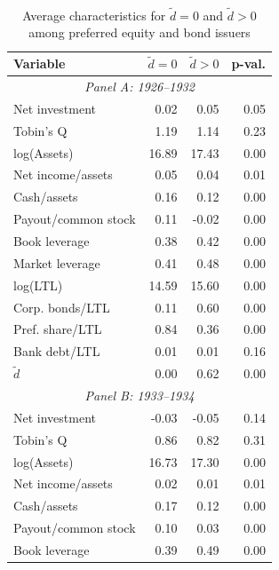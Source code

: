 
\begin{table}[p]
\centering
\caption{\\ Average characteristics for $\tilde{d} = 0$ and $\tilde{d} > 0$ among preferred equity and bond issuers} \scriptsize \label{tab:sum_diff_pos}
    \begin{threeparttable}
        \begin{tabular}{lrrr}
            \toprule
            Variable & \ensuremath{\tilde{d}=0} & \ensuremath{\tilde{d}>0} & p-val. \\
            \midrule
            \multicolumn{4}{c}{\textit{Panel A: 1926--1932}} \\
            \midrule
            Net investment & 0.02 & 0.05 & 0.05 \\
            Tobin's Q & 1.19 & 1.14 & 0.23 \\
            log(Assets) & 16.89 & 17.43 & 0.00 \\
            Net income/assets & 0.05 & 0.04 & 0.01 \\
            Cash/assets & 0.16 & 0.12 & 0.00 \\
            Payout/common stock & 0.11 & -0.02 & 0.00 \\
            Book leverage & 0.38 & 0.42 & 0.00 \\
            Market leverage & 0.41 & 0.48 & 0.00 \\
            log(LTL) & 14.59 & 15.60 & 0.00 \\
            Corp. bonds/LTL & 0.11 & 0.60 & 0.00 \\
            Pref. share/LTL & 0.84 & 0.36 & 0.00 \\
            Bank debt/LTL & 0.01 & 0.01 & 0.16 \\
            \ensuremath{\tilde{d}} & 0.00 & 0.62 & 0.00 \\
            \midrule
            \multicolumn{4}{c}{\textit{Panel B: 1933--1934}} \\
            \midrule
            Net investment & -0.03 & -0.05 & 0.14 \\
            Tobin's Q & 0.86 & 0.82 & 0.31 \\
            log(Assets) & 16.73 & 17.30 & 0.00 \\
            Net income/assets & 0.02 & 0.01 & 0.01 \\
            Cash/assets & 0.17 & 0.12 & 0.00 \\
            Payout/common stock & 0.10 & 0.03 & 0.00 \\
            Book leverage & 0.39 & 0.49 & 0.00 \\

\end{tabular}
\end{threeparttable}
\end{table}
